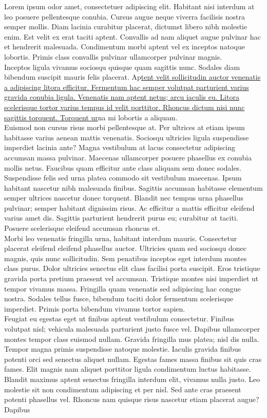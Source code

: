 \documentclass{article}
\begin{document}
Lorem ipsum odor amet, consectetuer adipiscing elit. Habitant nisi interdum at leo posuere pellentesque conubia. Cursus augue neque viverra facilisis nostra semper mollis. Diam lacinia curabitur placerat, dictumst libero nibh molestie enim. Est velit ex erat taciti aptent. Convallis ad nam aliquet augue pulvinar hac et hendrerit malesuada. Condimentum morbi aptent vel ex inceptos natoque lobortis. Primis class convallis pulvinar ullamcorper pulvinar magnis.\\Inceptos ligula vivamus sociosqu quisque quam sagittis nunc. Sodales diam bibendum suscipit mauris felis placerat. Ap\uline{tent velit sollicitudin auctor venenatis a adipiscing litora efficitur. Fermentum hac semper volutpat parturient varius gravida conubia ligula. Venenatis nam aptent netus; arcu iaculis eu. Litora scelerisque tortor varius tempus id velit porttitor. Rhoncus dictum nisi nunc sagittis torquent. Torquent ur}na mi lobortis a aliquam.\\Euismod non cursus risus morbi pellentesque at. Per ultrices at etiam ipsum habitasse varius aenean mattis venenatis. Sociosqu ultricies ligula suspendisse imperdiet lacinia ante? Magna vestibulum at lacus consectetur adipiscing accumsan massa pulvinar. Maecenas ullamcorper posuere phasellus ex conubia mollis netus. Faucibus quam efficitur ante class aliquam sem donec sodales.\\Suspendisse felis sed urna platea commodo sit vestibulum maecenas. Ipsum habitant nascetur nibh malesuada finibus. Sagittis accumsan habitasse elementum semper ultrices nascetur donec torquent. Blandit nec tempus urna phasellus pulvinar; semper habitant dignissim risus. Ac efficitur a mattis efficitur eleifend varius amet dis. Sagittis parturient hendrerit purus eu; curabitur at taciti. Posuere scelerisque eleifend accumsan rhoncus et.\\Morbi leo venenatis fringilla urna, habitant interdum mauris. Consectetur placerat eleifend eleifend phasellus auctor. Ultricies quam sed sociosqu donec magnis, quis nunc sollicitudin. Sem penatibus inceptos eget interdum montes class purus. Dolor ultricies senectus elit class facilisi porta suscipit. Eros tristique gravida porta pretium praesent vel accumsan. Tristique montes nisi imperdiet ut tempor vivamus massa. Fringilla quam venenatis sed adipiscing hac congue nostra. Sodales tellus fusce, bibendum taciti dolor fermentum scelerisque imperdiet. Primis porta bibendum vivamus tortor sapien.\\Feugiat eu egestas eget ut finibus aptent vestibulum consectetur. Finibus volutpat nisl; vehicula malesuada parturient justo fusce vel. Dapibus ullamcorper montes tempor class euismod nullam. Gravida fringilla mus platea; nisl dis nulla. Tempor magna primis suspendisse natoque molestie. Iaculis gravida finibus potenti orci sed senectus aliquet nullam. Egestas fames massa finibus sit quis cras fames. Elit magnis nam aliquet porttitor ligula condimentum luctus habitasse.\\Blandit maximus aptent senectus fringilla interdum elit, vivamus nulla justo. Leo molestie sit non condimentum adipiscing et per nisl. Sed ante cras praesent potenti phasellus vel. Rhoncus nam quisque risus nascetur etiam placerat augue? Dapibus 
\end{document}
